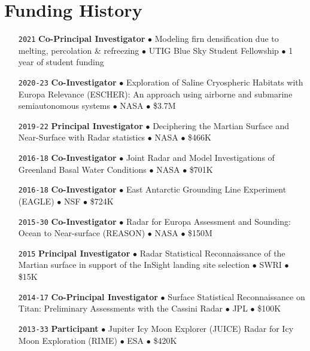 \section*{Funding History}

\begin{itemize}[leftmargin=5.8em, labelsep=1.5em]
    \setlength\itemsep{-.3em}
    
    \item[\texttt{2021}] \textbf{Co-Principal Investigator} $\bullet$ Modeling firn densification due to melting, percolation \& refreezing $\bullet$ UTIG Blue Sky Student Fellowship $\bullet$ 1 year of student funding
    
    \item[\texttt{2020-23}] \textbf{Co-Investigator} $\bullet$ Exploration of Saline Cryospheric Habitats with Europa Relevance (ESCHER): An approach using airborne and submarine semiautonomous systems $\bullet$ NASA $\bullet$ \$3.7M
    
    \item[\texttt{2019-22}] \textbf{Principal Investigator} $\bullet$ Deciphering the Martian Surface and Near-Surface with Radar statistics $\bullet$ NASA $\bullet$ \$466K
    
    \item[\texttt{2016-18}] \textbf{Co-Investigator} $\bullet$ Joint Radar and Model Investigations of Greenland Basal Water Conditions $\bullet$ NASA $\bullet$ \$701K
    
    \item[\texttt{2016-18}] \textbf{Co-Investigator} $\bullet$ East Antarctic Grounding Line Experiment (EAGLE) $\bullet$ NSF $\bullet$ \$724K
    
    \item[\texttt{2015-30}] \textbf{Co-Investigator} $\bullet$ Radar for Europa Assessment and Sounding: Ocean to Near-surface (REASON) $\bullet$ NASA $\bullet$ \$150M
    
    \item[\texttt{2015}] \textbf{Principal Investigator} $\bullet$ Radar Statistical Reconnaissance of the Martian surface in support of the InSight landing site selection $\bullet$ SWRI $\bullet$ \$15K
    
    \item[\texttt{2014-17}] \textbf{Co-Principal Investigator} $\bullet$ Surface Statistical Reconnaissance on Titan: Preliminary Assessments with the Cassini Radar $\bullet$ JPL $\bullet$ \$100K
    
    \item[\texttt{2013-33}] \textbf{Participant} $\bullet$ Jupiter Icy Moon  Explorer (JUICE) Radar for Icy Moon Exploration (RIME) $\bullet$ ESA $\bullet$ \$420K
    

\end{itemize}
